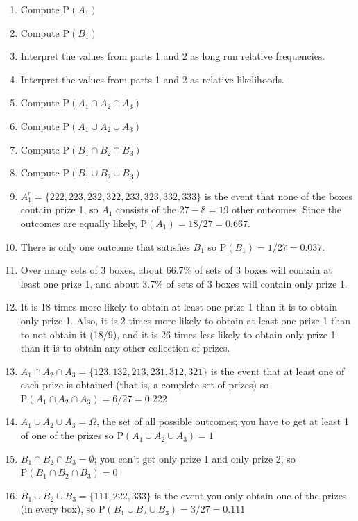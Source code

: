 \documentclass[
  letterpaper,
  DIV=11,
  numbers=noendperiod]{scrreprt}
\theoremstyle{plain}
\theoremstyle{definition}
\theoremstyle{definition}
\theoremstyle{definition}
\theoremstyle{remark}
\begin{document}
\begin{enumerate}
\def\labelenumi{\arabic{enumi}.}
\item
  Compute \(\textrm{P}(A_1)\)
\item
  Compute \(\textrm{P}(B_1)\)
\item
  Interpret the values from parts 1 and 2 as long run relative
  frequencies.
\item
  Interpret the values from parts 1 and 2 as relative likelihoods.
\item
  Compute \(\textrm{P}(A_1 \cap A_2 \cap A_3)\)
\item
  Compute \(\textrm{P}(A_1 \cup A_2 \cup A_3)\)
\item
  Compute \(\textrm{P}(B_1 \cap B_2 \cap B_3)\)
\item
  Compute \(\textrm{P}(B_1 \cup B_2 \cup B_3)\)
\item
  \(A_1^c = \{222, 223, 232, 322, 233, 323, 332, 333\}\) is the event
  that none of the boxes contain prize 1, so \(A_1\) consists of the
  \(27-8 = 19\) other outcomes. Since the outcomes are equally likely,
  \(\text{P}(A_1) = 18/27=0.667\).
\item
  There is only one outcome that satisfies \(B_1\) so
  \(\text{P}(B_1) = 1/27 = 0.037\).
\item
  Over many sets of 3 boxes, about 66.7\% of sets of 3 boxes will
  contain at least one prize 1, and about 3.7\% of sets of 3 boxes will
  contain only prize 1.
\item
  It is 18 times more likely to obtain at least one prize 1 than it is
  to obtain only prize 1. Also, it is 2 times more likely to obtain at
  least one prize 1 than to not obtain it (18/9), and it is 26 times
  less likely to obtain only prize 1 than it is to obtain any other
  collection of prizes.
\item
  \(A_1 \cap A_2 \cap A_3 = \{123, 132, 213, 231, 312, 321\}\) is the
  event that at least one of each prize is obtained (that is, a complete
  set of prizes) so \(\textrm{P}(A_1 \cap A_2 \cap A_3) = 6/27 = 0.222\)
\item
  \(A_1 \cup A_2 \cup A_3 = \Omega\), the set of all possible outcomes;
  you have to get at least 1 of one of the prizes so
  \(\textrm{P}(A_1 \cup A_2 \cup A_3) = 1\)
\item
  \(B_1 \cap B_2 \cap B_3=\emptyset\); you can't get only prize 1 and
  only prize 2, so \(\textrm{P}(B_1 \cap B_2 \cap B_3) = 0\)
\item
  \(B_1 \cup B_2 \cup B_3 = \{111, 222, 333\}\) is the event you only
  obtain one of the prizes (in every box), so
  \(\textrm{P}(B_1 \cup B_2 \cup B_3) = 3/27 = 0.111\)
\end{enumerate}
\end{document}
